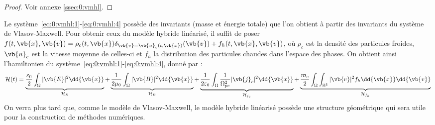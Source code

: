 \begin{proof}
  Voir annexe \ref{ssec:0:vmhl}.
\end{proof}

Le système~\eqref{eq:0:vmhl:1}-\eqref{eq:0:vmhl:4} possède des invariants (masse et énergie totale) que l'on obtient à partir des invariants du système de Vlasov-Maxwell. Pour obtenir ceux du modèle hybride linéarisé, il suffit de poser $f(t,\vb{x},\vb{v})=\rho_c(t,\vb{x})\delta_{\vb{v}=\vb{u}_c(t,\vb{x})}(\vb{v}) + f_h(t,\vb{x},\vb{v})$, où $\rho_c$ est la densité des particules froides, $\vb{u}_c$ est la vitesse moyenne de celles-ci et $f_h$ la distribution des particules chaudes dans l'espace des phases. On obtient ainsi l'hamiltonien du système~\eqref{eq:0:vmhl:1}-\eqref{eq:0:vmhl:4}, donné par :
\begin{equation}
  \mathcal{H}(t) = \underbrace{\frac{\varepsilon_0}{2} \int_{\Omega} |\vb{E}|^2 \dd{\vb{x}} }_{\mathcal{H}_E}
              + \underbrace{\frac{1}{2\mu_0}        \int_{\Omega} |\vb{B}|^2 \dd{\vb{x}} }_{\mathcal{H}_B}
              + \underbrace{\frac{1}{2\varepsilon_0}\int_{\Omega} \frac{1}{\Omega_{pe}^2}|\vb{j}_c|^2 \dd{\vb{x}} }_{\mathcal{H}_{j_c}}
              + \underbrace{\frac{m_e}{2}           \int_{\Omega}\int_{\mathbb{R}^3} |\vb{v}|^2f_h \dd{\vb{x}}\dd{\vb{v}} }_{\mathcal{H}_{f_h}}
\end{equation}
On verra plus tard que, comme le modèle de Vlasov-Maxwell, le modèle hybride linéarisé possède une structure géométrique qui sera utile pour la construction de méthodes numériques.
